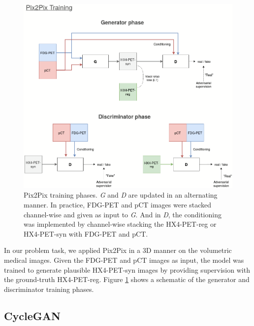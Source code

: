 \begin{figure}[h!]
    \centering
    \includegraphics[width=\linewidth]{figures/GANs/Pix2Pix.png}
    \caption{Pix2Pix training phases. \textit{G} and \textit{D} are updated in an alternating manner. In practice, FDG-PET and pCT images were stacked channel-wise and given as input to \textit{G}. And in \textit{D}, the conditioning was implemented by channel-wise stacking the HX4-PET-reg or HX4-PET-syn with FDG-PET and pCT.}
    \label{fig:pix2pix}
\end{figure}{}

In our problem task, we applied Pix2Pix in a 3D manner on the volumetric medical images. Given the FDG-PET and pCT images as input, the model was trained to generate plausible HX4-PET-syn images by providing supervision with the ground-truth HX4-PET-reg. Figure \ref{fig:pix2pix} shows a schematic of the generator and discriminator training phases.


\subsection{CycleGAN}
\label{cyclegan}

